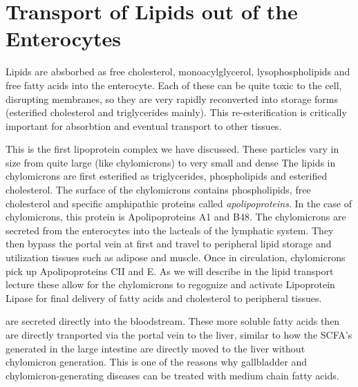 \documentclass{tufte-handout}
\begin{document}
\section{Transport of Lipids out of the Enterocytes}

Lipids are absborbed as free cholesterol, monoacylglycerol, lysophospholipids and free fatty acids into the enterocyte.  Each of these can be quite toxic to the cell, disrupting membranes, so they are very rapidly reconverted into storage forms (esterified cholesterol and triglycerides mainly).  This re-esterification is critically important for absorbtion and eventual transport to other tissues.

  This is the first lipoprotein complex we have discussed.  These particles vary in size from quite large (like chylomicrons) to very small and dense  The lipids in chylomicrons are first esterified as triglycerides, phospholipids and esterified cholesterol.  The surface of the chylomicrons contains phospholipids, free cholesterol and specific amphipathic proteins called \emph{apolipoproteins}.  In the case of chylomicrons, this protein is Apolipoproteins A1 and B48.  The chylomicrons are secreted from the enterocytes into the lacteals of the lymphatic system.  They then bypass the portal vein at first and travel to peripheral lipid storage and utilization tissues such as adipose and muscle.  Once in circulation, chylomicrons pick up Apolipoproteins CII and E.  As we will describe in the lipid transport lecture these allow for the chylomicrons to regognize and activate Lipoprotein Lipase for final delivery of fatty acids and cholesterol to peripheral tissues.  

 are secreted directly into the bloodstream.  These more soluble fatty acids then are directly tranported via the portal vein to the liver, similar to how the SCFA's generated in the large intestine are directly moved to the liver without chylomicron generation.  This is one of the reasons why gallbladder and chylomicron-generating diseases can be treated with medium chain fatty acids.




\end{document}
